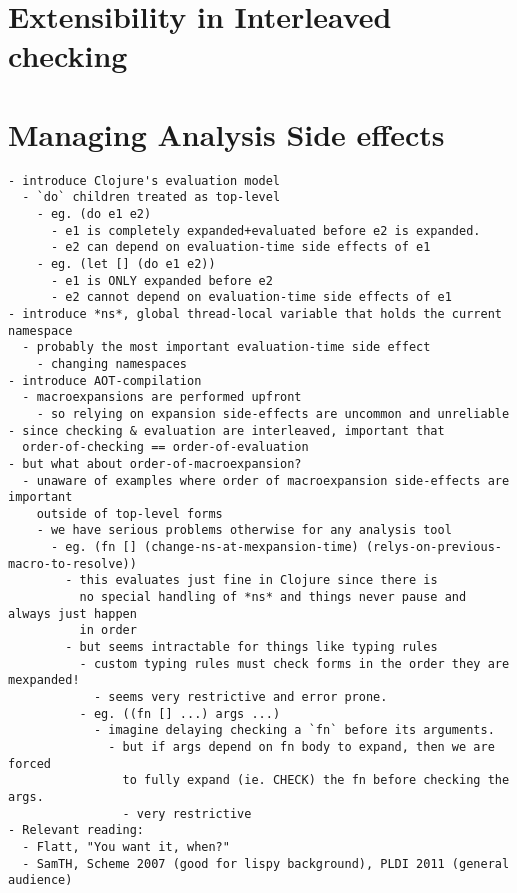 \chapter{Extensibility in Interleaved checking}

\chapter{Managing Analysis Side effects}

{
\singlespacing
\begin{verbatim}
- introduce Clojure's evaluation model
  - `do` children treated as top-level
    - eg. (do e1 e2)
      - e1 is completely expanded+evaluated before e2 is expanded.
      - e2 can depend on evaluation-time side effects of e1
    - eg. (let [] (do e1 e2))
      - e1 is ONLY expanded before e2
      - e2 cannot depend on evaluation-time side effects of e1
- introduce *ns*, global thread-local variable that holds the current namespace
  - probably the most important evaluation-time side effect
    - changing namespaces
- introduce AOT-compilation
  - macroexpansions are performed upfront
    - so relying on expansion side-effects are uncommon and unreliable
- since checking & evaluation are interleaved, important that
  order-of-checking == order-of-evaluation
- but what about order-of-macroexpansion?
  - unaware of examples where order of macroexpansion side-effects are important
    outside of top-level forms
    - we have serious problems otherwise for any analysis tool
      - eg. (fn [] (change-ns-at-mexpansion-time) (relys-on-previous-macro-to-resolve))
        - this evaluates just fine in Clojure since there is
          no special handling of *ns* and things never pause and always just happen
          in order
        - but seems intractable for things like typing rules
          - custom typing rules must check forms in the order they are mexpanded!
            - seems very restrictive and error prone.
          - eg. ((fn [] ...) args ...)
            - imagine delaying checking a `fn` before its arguments.
              - but if args depend on fn body to expand, then we are forced
                to fully expand (ie. CHECK) the fn before checking the args.
                - very restrictive
- Relevant reading:
  - Flatt, "You want it, when?"
  - SamTH, Scheme 2007 (good for lispy background), PLDI 2011 (general audience)
\end{verbatim}
}

